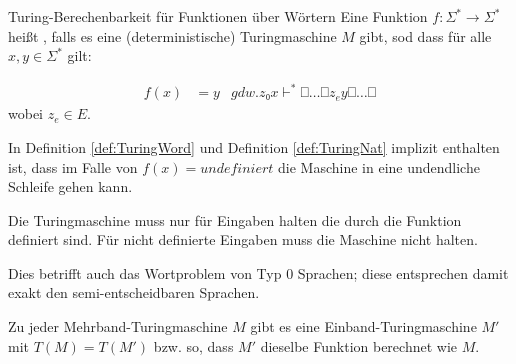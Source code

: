\documentclass{scrartcl}
\begin{document}
\begin{theorem}
\begin{theorem}
\begin{poof}
\begin{theorem}
\begin{remark}
\begin{definition}{Turing-Berechenbarkeit für Funktionen über Wörtern}\label{def:TuringWord}
Eine Funktion $f : Σ^* → Σ^*$ heißt ,
falls es eine (deterministische) Turingmaschine $M$ gibt,
sod dass für alle $x,y ∈ Σ^*$ gilt:

\begin{align*}
	f(x) &= y
		&gdw.
	z₀x ⊢^* ⎕\dots⎕z_ey⎕\dots⎕
\end{align*}
wobei $z_e ∈ E$.
\end{definition}

\begin{remark}
In Definition \ref{def:TuringWord} und Definition \ref{def:TuringNat} implizit
enthalten ist, dass im Falle von $f(x) = undefiniert$ die Maschine in eine 
undendliche Schleife gehen kann. 
\begin{remark}

\begin{remark}
Die Turingmaschine muss nur für Eingaben halten die durch die Funktion definiert 
sind. Für nicht definierte Eingaben muss die Maschine nicht halten.

Dies betrifft auch das Wortproblem von Typ 0 Sprachen;
diese entsprechen damit exakt den semi-entscheidbaren Sprachen.\autocite{TIKG:2003}
\end{remark}

\begin{theorem}
Zu jeder Mehrband-Turingmaschine $M$ gibt es eine Einband-Turingmaschine $M'$
mit $T(M) = T(M')$ bzw. so, dass $M'$ dieselbe Funktion berechnet wie $M$.
\end{theorem}



\end{remark}
\end{remark}
\end{remark}
\end{theorem}
\end{poof}
\end{theorem}
\end{theorem}
\end{document}
